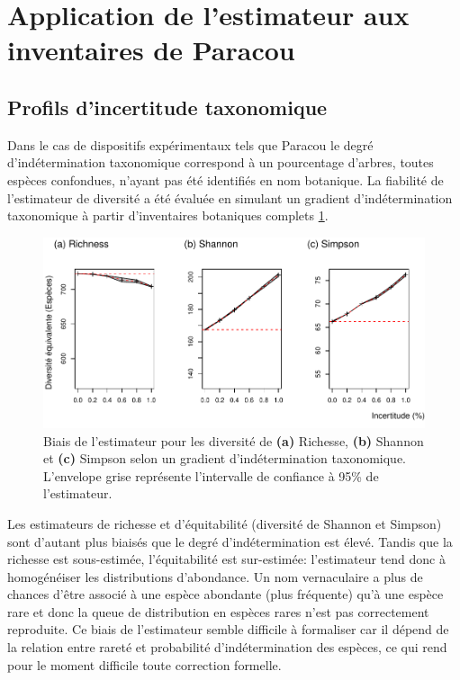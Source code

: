 \documentclass[
  11pt,
  french,
  A4paper,
  extrafontsizes,onecolumn,openright
  ]{memoir}
\begin{document}
\section{Application de l'estimateur aux inventaires de
Paracou}\label{application-de-lestimateur-aux-inventaires-de-paracou}

\subsection{Profils d'incertitude
taxonomique}\label{profils-dincertitude-taxonomique}

Dans le cas de dispositifs expérimentaux tels que Paracou le degré
d'indétermination taxonomique correspond à un pourcentage d'arbres,
toutes espèces confondues, n'ayant pas été identifiés en nom botanique.
La fiabilité de l'estimateur de diversité a été évaluée en simulant un
gradient d'indétermination taxonomique à partir d'inventaires botaniques
complets \ref{fig:FigTreesSp}.

\begin{figure}

{\centering \includegraphics[width=1\linewidth]{Manuscript_files/figure-latex/FigTreesSp-1} 

}

\caption{Biais de l'estimateur pour les diversité de \textbf{(a)} Richesse, \textbf{(b)} Shannon et \textbf{(c)} Simpson selon un gradient d'indétermination taxonomique. L'envelope grise représente l'intervalle de confiance à 95\% de l'estimateur.}\label{fig:FigTreesSp}
\end{figure}

Les estimateurs de richesse et d'équitabilité (diversité de Shannon et
Simpson) sont d'autant plus biaisés que le degré d'indétermination est
élevé. Tandis que la richesse est sous-estimée, l'équitabilité est
sur-estimée: l'estimateur tend donc à homogénéiser les distributions
d'abondance. Un nom vernaculaire a plus de chances d'être associé à une
espèce abondante (plus fréquente) qu'à une espèce rare et donc la queue
de distribution en espèces rares n'est pas correctement reproduite. Ce
biais de l'estimateur semble difficile à formaliser car il dépend de la
relation entre rareté et probabilité d'indétermination des espèces, ce
qui rend pour le moment difficile toute correction formelle.
\end{document}
